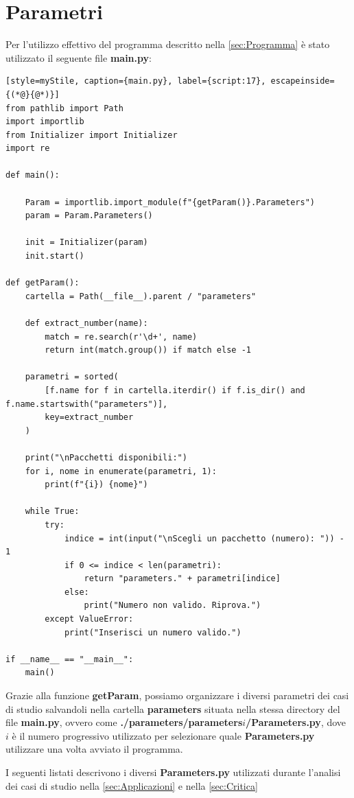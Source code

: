 \section{Parametri}
\label{sec:Parametri}

Per l'utilizzo effettivo del programma descritto nella \autoref{sec:Programma} è stato utilizzato il seguente file \textbf{main.py}:

\begin{lstlisting}[style=myStile, caption={main.py}, label={script:17}, escapeinside={(*@}{@*)}]
from pathlib import Path
import importlib
from Initializer import Initializer
import re

def main():
    
    Param = importlib.import_module(f"{getParam()}.Parameters")
    param = Param.Parameters()
    
    init = Initializer(param)
    init.start()

def getParam():
    cartella = Path(__file__).parent / "parameters"

    def extract_number(name):
        match = re.search(r'\d+', name)
        return int(match.group()) if match else -1

    parametri = sorted(
        [f.name for f in cartella.iterdir() if f.is_dir() and f.name.startswith("parameters")],
        key=extract_number
    )

    print("\nPacchetti disponibili:")
    for i, nome in enumerate(parametri, 1):
        print(f"{i}) {nome}")

    while True:
        try:
            indice = int(input("\nScegli un pacchetto (numero): ")) - 1
            if 0 <= indice < len(parametri):
                return "parameters." + parametri[indice]
            else:
                print("Numero non valido. Riprova.")
        except ValueError:
            print("Inserisci un numero valido.")

if __name__ == "__main__":
    main()
\end{lstlisting}

Grazie alla funzione \textbf{getParam}, possiamo organizzare i diversi parametri dei casi di studio salvandoli nella cartella \textbf{parameters}
situata nella stessa directory del file \textbf{main.py}, ovvero come \textbf{./parameters/parameters$i$/Parameters.py}, dove $i$ è il numero progressivo 
utilizzato per selezionare quale \textbf{Parameters.py} utilizzare una volta avviato il programma.

I seguenti listati descrivono i diversi \textbf{Parameters.py} utilizzati durante l'analisi dei casi di studio nella \autoref{sec:Applicazioni} e nella
\autoref{sec:Critica}

